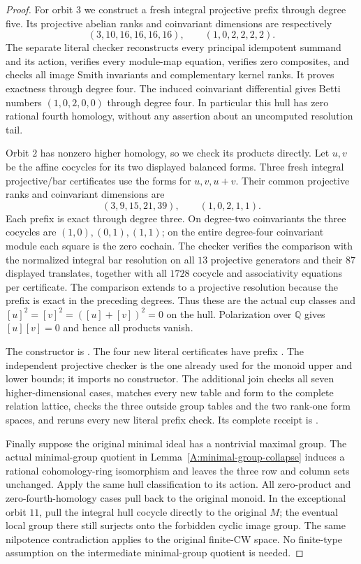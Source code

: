 \begin{proof}
For orbit $3$ we construct a fresh integral projective prefix
through degree five. Its projective abelian ranks and
coinvariant dimensions are respectively
\[
 (3,10,16,16,16,16),\qquad(1,0,2,2,2,2).
\]
The separate literal checker reconstructs every principal
idempotent summand and its action, verifies every module-map
equation, verifies zero composites, and checks all image Smith
invariants and complementary kernel ranks. It proves exactness
through degree four. The induced coinvariant differential gives
Betti numbers $(1,0,2,0,0)$ through degree four. In particular
this hull has zero rational fourth homology, without any
assertion about an uncomputed resolution tail.

Orbit $2$ has nonzero higher homology, so we check its products
directly. Let $u,v$ be the affine cocycles for its two displayed
balanced forms. Three fresh integral projective/bar certificates
use the forms for $u,v,u+v$. Their common projective ranks and
coinvariant dimensions are
\[
 (3,9,15,21,39),\qquad(1,0,2,1,1).
\]
Each prefix is exact through degree three. On degree-two
coinvariants the three cocycles are $(1,0),(0,1),(1,1)$;
on the entire degree-four coinvariant module each square is
the zero cochain. The checker verifies the comparison with
the normalized integral bar resolution on all $13$ projective
generators and their $87$ displayed translates, together with
all $1728$ cocycle and associativity equations per certificate.
The comparison extends to a projective resolution because
the prefix is exact in the preceding degrees. Thus these are
the actual cup classes and
$[u]^2=[v]^2=([u]+[v])^2=0$ on the hull. Polarization over
$\mathbb Q$ gives $[u][v]=0$ and hence all products vanish.

The constructor is .
The four new literal certificates have prefix
.
The independent projective checker is the one already used
for the monoid upper and lower bounds; it imports no constructor.
The additional join 
checks all seven higher-dimensional cases, matches every new
table and form to the complete relation lattice, checks the
three outside group tables and the two rank-one form spaces,
and reruns every new literal prefix check. Its complete receipt
is .

Finally suppose the original minimal ideal has a nontrivial
maximal group. The actual minimal-group quotient in
Lemma~\ref{A:minimal-group-collapse} induces a rational
cohomology-ring isomorphism and leaves the three row and column
sets unchanged. Apply the same hull classification to its
action. All zero-product and zero-fourth-homology cases pull
back to the original monoid. In the exceptional orbit $11$,
pull the integral hull cocycle directly to the original $M$;
the eventual local group there still surjects onto the forbidden
cyclic image group. The same nilpotence contradiction applies
to the original finite-CW space. No finite-type assumption on
the intermediate minimal-group quotient is needed.
\end{proof}

